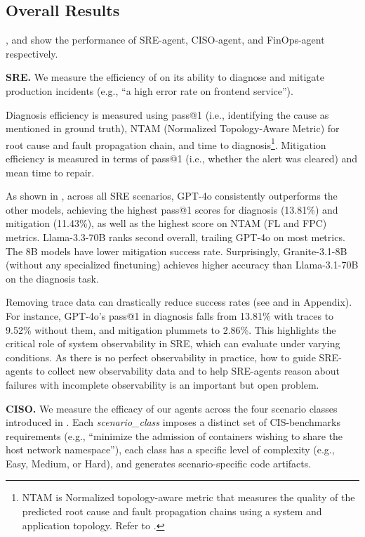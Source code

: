 \subsection{Overall Results}
,  and  show the performance of SRE-agent, CISO-agent, and FinOps-agent respectively. 

\textbf{SRE.} 
We measure the efficiency of \lumyn on its ability to diagnose and mitigate production incidents (e.g., ``a high error rate on frontend service'').


Diagnosis efficiency is measured using pass@1\cite{chen2021evaluating} (i.e., identifying the cause as mentioned in ground truth), NTAM (Normalized Topology-Aware Metric) for root cause and fault propagation chain, and time to diagnosis\footnote{NTAM is Normalized topology-aware metric that measures the quality of the predicted root cause and fault propagation chains using a system and application topology. Refer to .}.
Mitigation efficiency is measured in terms of pass@1 (i.e., whether the alert was cleared) and mean time to repair.

As shown in , across all SRE scenarios, GPT-4o consistently outperforms the other models, achieving the highest pass@1 scores for diagnosis (13.81\%) and mitigation (11.43\%), as well as the highest score on NTAM (FL and FPC) metrics. 
Llama-3.3-70B ranks second overall, trailing GPT-4o on most metrics.
The 8B models have lower mitigation success rate. 
Surprisingly, Granite-3.1-8B (without any specialized finetuning) achieves higher accuracy than Llama-3.1-70B on the diagnosis task. 

Removing trace data can drastically reduce success rates (see  and  in Appendix). For instance, GPT-4o's pass@1 in diagnosis falls from 13.81\% with traces to 9.52\% without them, and mitigation plummets to 2.86\%. This highlights the critical role of system observability in SRE, which \bench can evaluate under varying conditions. As there is no perfect observability in practice, how to guide SRE-agents to collect new observability data and to help SRE-agents reason about failures with incomplete observability is an important but open problem.

\textbf{CISO.}
We measure the efficacy of our agents across the four scenario classes introduced in . Each \textit{scenario\_class} imposes a distinct set of CIS-benchmarks requirements (e.g., ``minimize the admission of containers wishing to share the host network namespace''), each class has a specific level of complexity (e.g., Easy, Medium, or Hard), and generates scenario-specific code artifacts. 

